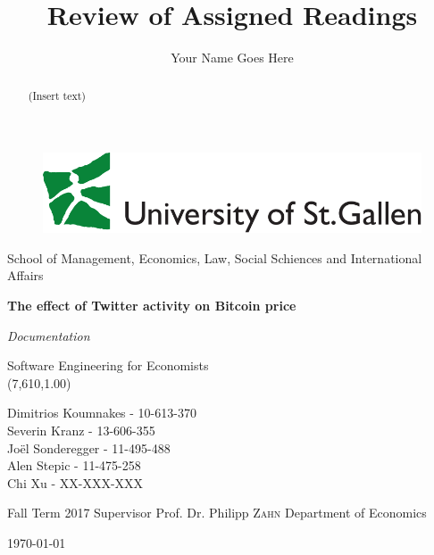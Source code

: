 \documentclass[a4paper,12pt]{article}
\title{Review of Assigned Readings}
\author{Your Name Goes Here}
\begin{document}
    \begin{titlepage}
      	\begin{figure}
      	\centering
        \includegraphics[scale=0.35]{logohsg}
        \end{figure}
        \centering
        School of Management, Economics, Law, Social Schiences and International Affairs \par
        \vspace{2.5cm}
        {\huge\bfseries The effect of Twitter activity on
Bitcoin price\par}      
        {\Huge\itshape Documentation\par}
        \vspace{1.5cm}     
        {Software Engineering for Economists \\ (7,610,1.00) \par}
        \vspace{1.3cm}
        {Dimitrios Koumnakes - 10-613-370 \\ Severin Kranz - 13-606-355 \\ Joël Sonderegger - 11-495-488 \\
       	Alen Stepic - 11-475-258 \\Chi Xu - XX-XXX-XXX \par}
        \vspace{1cm}
        Fall Term 2017
        \vfill
        Supervisor
        \linebreak
        Prof. Dr. Philipp \textsc{Zahn}
        \linebreak
        Department of Economics
          
     {\centering \today\par}
    
    \end{titlepage}
    
    \begin{abstract}
    \begin{spacing}{1.5}
    
  (Insert text)

    \end{spacing}
    
    \end{abstract}
\end{document}
